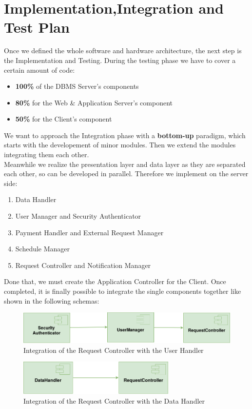 \documentclass[numbers=noenddot, 12pt, a4paper, oneside]{scrbook}
\begin{document}
\chapter{Implementation,Integration and Test Plan}

Once we defined the whole software and hardware architecture, the next step is the Implementation and Testing. During the testing phase we have to cover a certain amount of code:
\begin{itemize}
	\item \textbf{100\%} of the DBMS Server's components
	\item \textbf{80\%} for the Web \& Application Server's component
	\item \textbf{50\%} for the Client's component
\end{itemize}
We want to approach the Integration phase with a \textbf{bottom-up} paradigm, which starts with the developement of minor modules. Then we extend the modules integrating them each other.\\

Meanwhile we realize the presentation layer and data layer as they are separated each other, so can be developed in parallel. Therefore we implement on the server side:
\begin{enumerate}
	\item Data Handler
	\item User Manager and Security Authenticator
	\item Payment Handler and External Request Manager
	\item Schedule Manager
	\item Request Controller and Notification Manager
\end{enumerate}

Done that, we must create the Application Controller for the Client. Once completed, it is finally possible to integrate the single components together like shown in the following schemas:


\begin{figure}[H]
	\centering
	\includegraphics[width=1\textwidth,angle=-0]{images/impleServer1}
	\caption{Integration of the Request Controller with the User Handler}
\end{figure}

\begin{figure}[H]
	\centering
	\includegraphics[width=0.7\textwidth,angle=-0]{images/impleServer2}
	\caption{Integration of the Request Controller with the Data Handler}
\end{figure}
\end{document}
